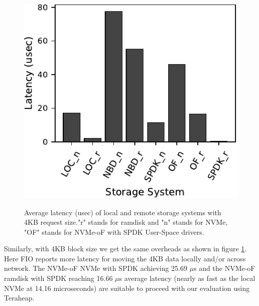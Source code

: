 \begin{figure}[H]
  \includegraphics[width=\linewidth]{figures/fio_4k.pdf}\\
\caption{Average latency (usec) of local and remote storage systems with 4KB request size."r" stands for ramdisk and "n" stands for NVMe, "OF" stands for NVMe-oF with SPDK User-Space drivers.}
\label{fig:fio_4k}
\end{figure}

Similarly, with 4KB block size we get the same overheads as shown in figure
\ref{fig:fio_4k}. Here FIO reports more latency for moving the 4KB data locally
and/or across network. The NVMe-oF NVMe with SPDK achieving 25.69 $\mu$s and the NVMe-oF ramdisk with SPDK reaching 16.66 $\mu$s average latency (nearly as fast as the
local NVMe at 14.16 microseconds) are suitable to proceed with our evaluation
using Teraheap.



